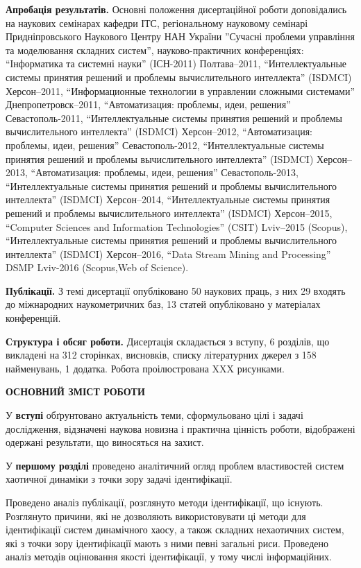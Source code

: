 \documentclass[a4paper,13pt]{atuaref}
\newcommand{\xsect}[1]{\medskip\begin{center}\textbf{#1}\end{center}\medskip\penalty10000}
\begin{document}
\smallskip
\textbf{Апробація результатів.}
Основні положення дисертаційної роботи доповідались на наукових
семінарах кафедри ІТС,
регіональному науковому семінарі Придніпровського Наукового Центру НАН України
''Сучасні проблеми управління та моделювання складних систем'',
науково-практичних конференціях:
``Інформатика та системні науки'' (ІСН-2011) Полтава--2011,
``Интеллектуальные системы принятия решений и проблемы вычислительного интеллекта'' (ISDMCI) Херсон--2011,
``Информационные технологии в управлении сложными системами'' Днепропетровск--2011,
``Автоматизация: проблемы, идеи, решения'' Севастополь-2011,
``Интеллектуальные системы принятия решений и проблемы вычислительного интеллекта'' (ISDMCI) Херсон--2012,
``Автоматизация: проблемы, идеи, решения'' Севастополь-2012,
``Интеллектуальные системы принятия решений и проблемы вычислительного интеллекта'' (ISDMCI) Херсон--2013,
``Автоматизация: проблемы, идеи, решения'' Севастополь-2013,
``Интеллектуальные системы принятия решений и проблемы вычислительного интеллекта'' (ISDMCI) Херсон--2014,
``Интеллектуальные системы принятия решений и проблемы вычислительного интеллекта'' (ISDMCI) Херсон--2015,
``Computer Sciences and Information Technologies'' (CSIT) Lviv--2015 (Scopus),
``Интеллектуальные системы принятия решений и проблемы вычислительного интеллекта'' (ISDMCI) Херсон--2016,
``Data Stream Mining and Processing'' DSMP Lviv-2016 (Scopus,Web of Science).

\smallskip
\textbf{Публікації.}
З темі дисертації опубліковано
50 наукових праць,
з них
29 входять до міжнародних наукометричних баз,
13 статей опубліковано у матеріалах конференцій.

\smallskip
\textbf{Структура і обсяг роботи.}
Дисертація складається з вступу, 6 розділів, що викладені на
312 сторінках, висновків, списку літературних джерел з
158 найменувань,
1 додатка.
Робота проілюстрована XXX рисунками.


\xsect{ОСНОВНИЙ ЗМІСТ РОБОТИ}

У \textbf{вступі} обґрунтовано актуальність теми,
сформульовано цілі і задачі дослідження,
відзначені наукова новизна і практична цінність роботи, відображені
одержані результати, що виносяться на захист.

У \textbf{першому розділі}
проведено аналітичний огляд проблем
властивостей систем хаотичної динаміки
з точки зору задачі ідентифікації.

Проведено аналіз публікації, розглянуто методи ідентифікації, що існують.
Розглянуто причини, які не дозволяють використовувати ці методи для
ідентифікації систем динамічного хаосу, а також складних нехаотичних систем, які
з точки зору ідентифікації мають з ними певні загальні риси.  Проведено аналіз
методів оцінювання якості ідентифікації, у тому числі інформаційних.
\end{document}
